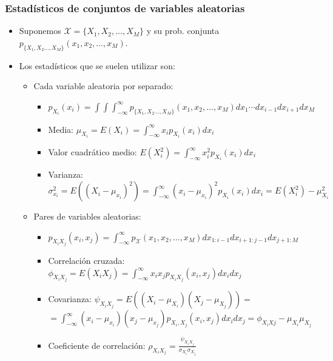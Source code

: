 \documentclass{beamer}
\numberwithin{section}{part}
\begin{document}
\begin{frame}
  \frametitle{Estadísticos de conjuntos de variables aleatorias}
  \footnotesize

  \begin{itemize}
    \item Suponemos $\mathcal{X}=\{X_1,X_2,\dots,X_M\}$ y su prob. conjunta $p_{\{X_1,X_2\dots,X_M\}}(x_1,x_2,\dots,x_M)$.
    \item Los estadísticos que se suelen utilizar son:
    \begin{itemize}
      \footnotesize
      \item Cada variable aleatoria por separado:

      \begin{itemize}
        \scriptsize
        \item  $p_{X_i}(x_i)\!\!=\!\!\int\!\! \int\!\! \int_{-\infty}^{\infty} p_{\{X_1,X_2\dots,X_M\}}\!(x_1,x_2,\dots,x_M)dx_1\cdots dx_{i-1}dx_{i+1}dx_M$
        \vspace{0.1cm}
        \item Media: $\mu_{X_i}=E(X_i)=\int_{-\infty}^{\infty}x_i p_{X_i}(x_i)dx_i$
        \vspace{0.1cm}
        \item Valor cuadrático medio: $E(X_i^2)=\int_{-\infty}^{\infty}x_i^2 p_{X_i}(x_i)dx_i$
        \vspace{0.1cm}
        \item Varianza: $\sigma_{x_i}^2\!=\!E((X_i\!-\!\mu_{x_i})^2)\!=\!\!\int_{-\infty}^{\infty}\!(x_i\!-\!\mu_{x_i})^2 p_{X_i}(x_i)dx_i\!=\!E(X_i^2)\!-\!\mu_{X_i}^2$  
      \end{itemize}

      \item Pares de variables aleatorias:
      \begin{itemize}
        \scriptsize
        \item  $p_{X_iX_j}(x_i,x_j)\!\!= \int_{-\infty}^{\infty} p_{\mathcal{X}} (x_1,x_2,\dots,x_M)dx_{1:i-1} dx_{i+1:j-1}dx_{j+1:M}$
        \vspace{0.1cm}
        \item Correlación cruzada: $\phi_{X_iX_j}\!=\!E(X_iX_j)\!=\! \int_{-\infty}^{\infty}\!\! x_i x_j p_{X_iX_j}(x_i,x_j)dx_i dx_j$
        \vspace{0.1cm}
        \item Covarianza: $\psi_{X_iX_j}=E((X_i-\mu_{X_i})(X_j-\mu_{X_j}))=$
        \hspace{0.5cm}$=\int_{-\infty}^{\infty} (x_i-\mu_{x_i}) (x_j-\mu_{x_j}) p_{X_i,X_j}(x_i,x_j)dx_i dx_j=\phi_{X_iXj}-\mu_{X_i}\mu_{X_j}$
        \item Coeficiente de correlación: $\rho_{X_iX_j}=\frac{\psi_{X_iX_j}}{\sigma_{X_i}\sigma_{X_j}}$
      \end{itemize}  
    \end{itemize}
  \end{itemize}
\end{frame}
\end{document}
